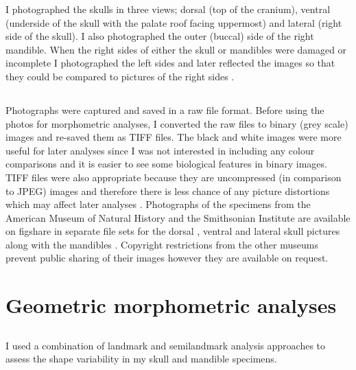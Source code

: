 	I photographed the skulls in three views; dorsal (top of the cranium), ventral (underside of the skull with the palate roof facing uppermost) and lateral (right side of the skull). I also photographed the outer (buccal) side of the right mandible. When the right sides of either the skull or mandibles were damaged or incomplete I photographed the left sides and later reflected the images so that they could be compared to pictures of the right sides \citep[e.g.][]{Barrow2008}.


\subsection{}
	Photographs were captured and saved in a raw file format. Before using the photos for morphometric analyses, I converted the raw files to binary (grey scale) images and re-saved them as TIFF files. The black and white images were more useful for later analyses since I was not interested in including any colour comparisons and it is easier to see some biological features in binary images. TIFF files were also appropriate because they are uncompressed (in comparison to JPEG) images and therefore there is less chance of any picture distortions which may affect later analyses \citep{HERC2013}.
	Photographs of the specimens from the American Museum of Natural History and the Smithsonian Institute are available on figshare in separate file sets for the dorsal \citep{Finlay2013d}, ventral \citep{Finlay2013v} and lateral \citep{Finlay2013l} skull pictures along with the mandibles \citep{Finlay2013m}. Copyright restrictions from the other museums prevent public sharing of their images however they are available on request.
	


\section{Geometric morphometric analyses}
\label{sect:morphometrics}

\subsection{}


	I used a combination of landmark and semilandmark analysis approaches to assess the shape variability in my skull and mandible specimens. 

